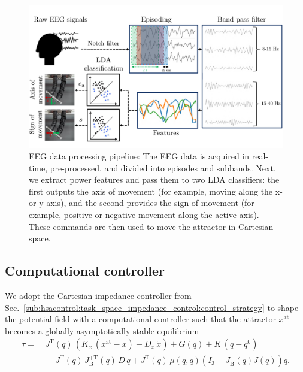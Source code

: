 \begin{figure}
\begin{center}
    \includegraphics[width=\columnwidth]{braincontrol/figures/eeg_pipeline/eeg_pipeline_v3_compressed.pdf}
    \caption{EEG data processing pipeline: The EEG data is acquired in real-time, pre-processed, and divided into episodes and subbands. Next, we extract power features and pass them to two LDA classifiers: the first outputs the axis of movement (for example, moving along the x- or y-axis), and the second provides the sign of movement (for example, positive or negative movement along the active axis). These commands are then used to move the attractor in Cartesian space.}
    \label{fig:braincontrol:eeg_pipeline}
\end{center}
\end{figure}

\subsection{Computational controller}\label{sub:braincontrol:computational_controller}
We adopt the Cartesian impedance controller from Sec.~\ref{sub:hsacontrol:task_space_impedance_control:control_strategy} to shape the potential field with a computational controller such that the attractor $x^\mathrm{at}$ becomes a globally asymptotically stable equilibrium
\begin{equation}\label{eq:braincontrol:cartesian_impedance_controller}
\begin{split}
    \tau =& \: J^\mathrm{T}(q) \, \left (K_x \, (x^\mathrm{at} - x) - D_x \, \dot{x} \right ) + G(q) + K \, (q-q^0)\\
    & \: + J^\mathrm{T}(q) \, J_\mathrm{B}^{+\mathrm{T}}(q) \, D \, \dot{q} + J^\mathrm{T}(q) \, \mu(q,\dot{q}) \left ( I_3 - J_\mathrm{B}^+(q) J(q) \right )\dot{q}.
\end{split}
\end{equation}

